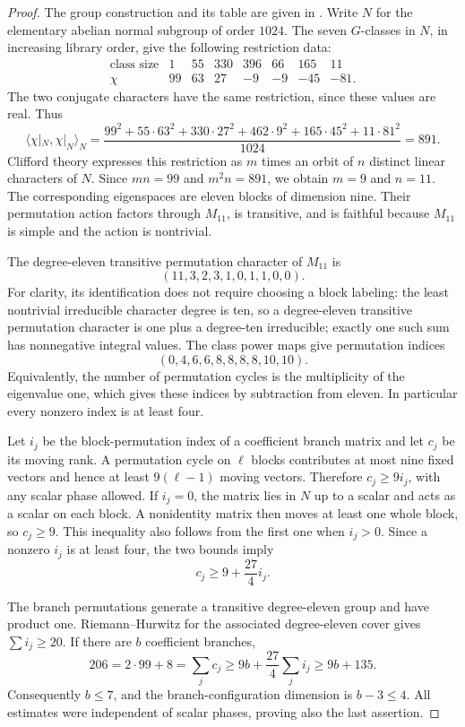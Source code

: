 \begin{proof}
The group construction and its table are given in
\cite[\S1.2-9]{CTblLib}. Write $N$ for the elementary abelian normal
subgroup of order $1024$. The seven $G$-classes in $N$, in increasing
library order, give the following restriction data:
\[
\begin{array}{c|rrrrrrr}
\text{class size}&1&55&330&396&66&165&11\\
\chi&99&63&27&-9&-9&-45&-81.
\end{array}
\]
The two conjugate characters have the same restriction, since these
values are real. Thus
\[
 \langle\chi|_N,\chi|_N\rangle_N
 =\frac{99^2+55\cdot63^2+330\cdot27^2
       +462\cdot9^2+165\cdot45^2+11\cdot81^2}{1024}
 =891.
\]
Clifford theory expresses this restriction as $m$ times an orbit of
$n$ distinct linear characters of $N$. Since $mn=99$ and
$m^2n=891$, we obtain $m=9$ and $n=11$. The corresponding eigenspaces
are eleven blocks of dimension nine. Their permutation action
factors through $M_{11}$, is transitive, and is faithful because
$M_{11}$ is simple and the action is nontrivial.

The degree-eleven transitive permutation character of $M_{11}$ is
\[
 (11,3,2,3,1,0,1,1,0,0).
\]
For clarity, its identification does not require choosing a block
labeling: the least nontrivial irreducible character degree is ten,
so a degree-eleven transitive permutation character is one plus a
degree-ten irreducible; exactly one such sum has nonnegative integral
values. The class power maps give permutation indices
\[
 (0,4,6,6,8,8,8,8,10,10).
\]
Equivalently, the number of permutation cycles is the multiplicity
of the eigenvalue one, which gives these indices by subtraction
from eleven. In particular every nonzero index is at least four.

Let $i_j$ be the block-permutation index of a coefficient branch
matrix and let $c_j$ be its moving rank. A permutation cycle on
$\ell$ blocks contributes at most nine fixed vectors and hence at
least $9(\ell-1)$ moving vectors. Therefore $c_j\ge9i_j$, with any
scalar phase allowed. If $i_j=0$, the matrix lies in $N$ up to a
scalar and acts as a scalar on each block. A nonidentity matrix
then moves at least one whole block, so $c_j\ge9$. This inequality
also follows from the first one when $i_j>0$. Since a nonzero
$i_j$ is at least four, the two bounds imply
\[
 c_j\ge9+\frac{27}{4}i_j.
\]

The branch permutations generate a transitive degree-eleven group
and have product one. Riemann--Hurwitz for the associated degree-eleven
cover gives $\sum i_j\ge20$. If there are $b$ coefficient branches,
\[
 206=2\cdot99+8=\sum_jc_j
     \ge9b+\frac{27}{4}\sum_ji_j
     \ge9b+135.
\]
Consequently $b\le7$, and the branch-configuration dimension is
$b-3\le4$. All estimates were independent of scalar phases, proving
also the last assertion.
\end{proof}

